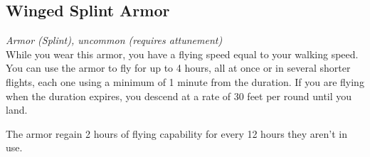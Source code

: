 \documentclass[letterpaper,openany,oneside,twocolumn]{book}
\begin{document}
\subsection*{Winged Splint Armor}
\textit{Armor (Splint), uncommon (requires attunement)}\\
While you wear this armor, you have a flying speed equal to your walking speed. You can use the armor to fly for up to 4 hours, all at once or in several shorter flights, each one using a minimum of 1 minute from the duration. If you are flying when the duration expires, you descend at a rate of 30 feet per round until you land.

The armor regain 2 hours of flying capability for every 12 hours they aren't in use.
\end{document}

